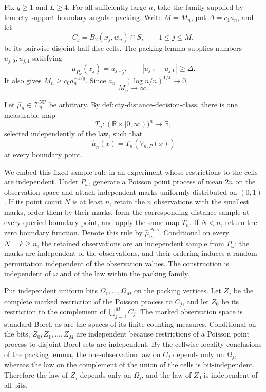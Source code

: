 Fix \(q\geq1\) and \(L\geq4\).  For all sufficiently large \(n\), take the family supplied by \(\mathrm{lem:cty\text{-}support\text{-}boundary\text{-}angular\text{-}packing}\).  Write \(M=M_n\), put \(\Delta=c_1a_n\), and let
\[
 C_j=B_2(x_j,w_n)\cap S,\qquad 1\leq j\leq M,
\]
be its pairwise disjoint half-disc cells.  The packing lemma supplies numbers \(u_{j,0},u_{j,1}\) satisfying
\[
 \mu_{P_\omega}(x_j)=u_{j,\omega_j},
 \qquad |u_{j,1}-u_{j,0}|\geq\Delta.
\]
It also gives \(M_n\geq c_0a_n^{-1/q}\).  Since \(a_n=(\log n/n)^{1/4}\to0\),
\[
 M_n\longrightarrow\infty.
\]

Let \(\widehat\mu_n\in\mathcal T_n^{\mathrm{NP}}\) be arbitrary.  By \(\mathrm{def:cty\text{-}distance\text{-}decision\text{-}class}\), there is one measurable map
\[
 T_n:(\mathbb R\times[0,\infty))^n\longrightarrow\mathbb R,
\]
selected independently of the law, such that
\[
 \widehat\mu_n(x)=T_n(V_{n,P}(x))
\]
at every boundary point.

We embed this fixed-sample rule in an experiment whose restrictions to the cells are independent.  Under \(P_\omega\), generate a Poisson point process of mean \(2n\) on the observation space and attach independent marks uniformly distributed on \((0,1)\).  If its point count \(N\) is at least \(n\), retain the \(n\) observations with the smallest marks, order them by their marks, form the corresponding distance sample at every queried boundary point, and apply the same map \(T_n\).  If \(N<n\), return the zero boundary function.  Denote this rule by \(\widehat\mu_n^{\mathrm{Pois}}\).  Conditional on every \(N=k\geq n\), the retained observations are an independent sample from \(P_\omega\): the marks are independent of the observations, and their ordering induces a random permutation independent of the observation values.  The construction is independent of \(\omega\) and of the law within the packing family.

Put independent uniform bits \(\Omega_1,\ldots,\Omega_M\) on the packing vertices.  Let \(Z_j\) be the complete marked restriction of the Poisson process to \(C_j\), and let \(Z_0\) be its restriction to the complement of \(\bigcup_{j=1}^M C_j\).  The marked observation space is standard Borel, as are the spaces of its finite counting measures.  Conditional on the bits, \(Z_0,Z_1,\ldots,Z_M\) are independent because restrictions of a Poisson point process to disjoint Borel sets are independent.  By the cellwise locality conclusions of the packing lemma, the one-observation law on \(C_j\) depends only on \(\Omega_j\), whereas the law on the complement of the union of the cells is bit-independent.  Therefore the law of \(Z_j\) depends only on \(\Omega_j\), and the law of \(Z_0\) is independent of all bits.

